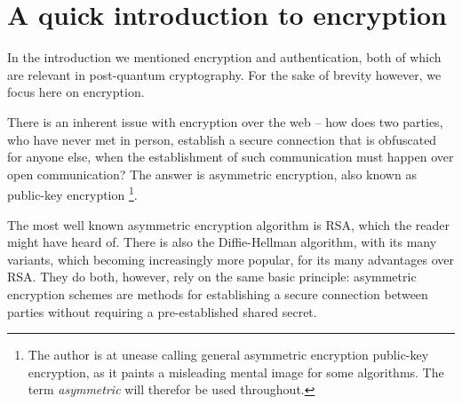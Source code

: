 \documentclass[conference]{IEEEtran}
\begin{document}
\section{A quick introduction to encryption}
In the introduction we mentioned encryption and authentication, both of which are relevant in post-quantum cryptography.
For the sake of brevity however, we focus here on encryption.

There is an inherent issue with encryption over the web -- how does two parties, who have never met in person, establish a secure connection that is obfuscated for anyone else, when the establishment of such communication must happen over open communication?
The answer is asymmetric encryption, also known as public-key encryption
\footnote{The author is at unease calling general asymmetric encryption public-key encryption, as it paints a misleading mental image for some algorithms. The term \emph{asymmetric} will therefor be used throughout.}.

The most well known asymmetric encryption algorithm is RSA, which the reader might have heard of.
There is also the Diffie-Hellman algorithm, with its many variants, which becoming increasingly more popular, for its many advantages over RSA.
They do both, however, rely on the same basic principle: asymmetric encryption schemes are methods for establishing a secure connection between parties without requiring a pre-established shared secret.

\end{document}

